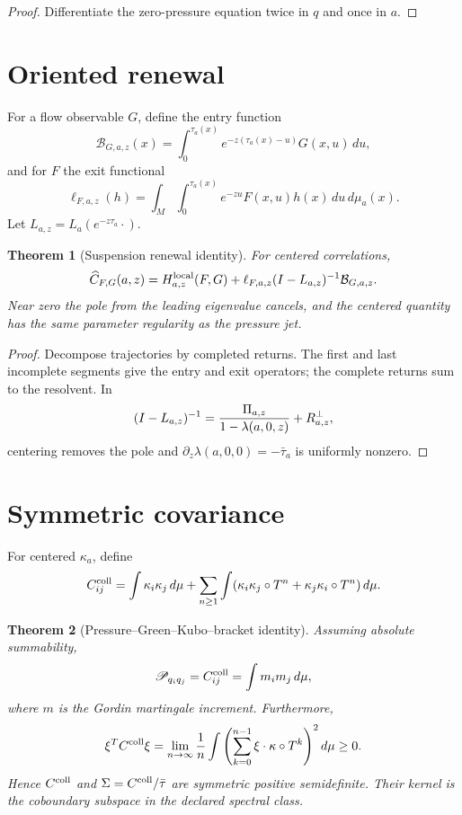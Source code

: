 \documentclass[11pt,reqno]{amsart}
\newtheorem{theorem}{Theorem}[section]
\theoremstyle{definition}
\theoremstyle{remark}
\newcommand{\Piop}{\Pi}
\begin{document}
\begin{proof}
Differentiate the zero-pressure equation twice in $q$ and once in $a$.
\end{proof}

\section{Oriented renewal}\label{sec:renewal}
For a flow observable $G$, define the entry function
\[
 \mathcal B_{G,a,z}(x)=
 \int_0^{\tau_a(x)}e^{-z(\tau_a(x)-u)}G(x,u)\,du,
\]
and for $F$ the exit functional
\[
 \ell_{F,a,z}(h)=
 \int_M\int_0^{\tau_a(x)}e^{-zu}F(x,u)h(x)\,du\,d\mu_a(x).
\]
Let $L_{a,z}=L_a(e^{-z\tau_a}\cdot)$.

\begin{theorem}[Suspension renewal identity]\label{thm:renewal}
For centered correlations,
\[
 \widehat C_{F,G}(a,z)=H_{a,z}^{\rm local}(F,G)
 +\ell_{F,a,z}(I-L_{a,z})^{-1}\mathcal B_{G,a,z}.
\]
Near zero the pole from the leading eigenvalue cancels, and the centered
quantity has the same parameter regularity as the pressure jet.
\end{theorem}

\begin{proof}
Decompose trajectories by completed returns.  The first and last incomplete
segments give the entry and exit operators; the complete returns sum to the
resolvent.  In
\[
 (I-L_{a,z})^{-1}={\Piop_{a,z}\over1-\lambda(a,0,z)}+R_{a,z}^{\perp},
\]
centering removes the pole and
$\partial_z\lambda(a,0,0)=-\bar\tau_a$ is uniformly nonzero.
\end{proof}

\section{Symmetric covariance}\label{sec:GK}
For centered $\kappa_a$, define
\[
 C_{ij}^{\rm coll}=
 \int\kappa_i\kappa_j\,d\mu+
 \sum_{n\ge1}\int
 (\kappa_i\kappa_j\circ T^n+
  \kappa_j\kappa_i\circ T^n)\,d\mu.
\]

\begin{theorem}[Pressure--Green--Kubo--bracket identity]\label{thm:GK}
Assuming absolute summability,
\[
 \mathscr P_{q_iq_j}=C_{ij}^{\rm coll}
 =\int m_i m_j\,d\mu,
\]
where $m$ is the Gordin martingale increment.  Furthermore,
\[
 \xi^TC^{\rm coll}\xi=
 \lim_{n\to\infty}{1\over n}
 \int\left(\sum_{k=0}^{n-1}\xi\cdot\kappa\circ T^k\right)^2d\mu\ge0.
\]
Hence $C^{\rm coll}$ and $\Sigma=C^{\rm coll}/\bar\tau$ are symmetric
positive semidefinite.  Their kernel is the coboundary subspace in the
declared spectral class.
\end{theorem}
\end{document}

